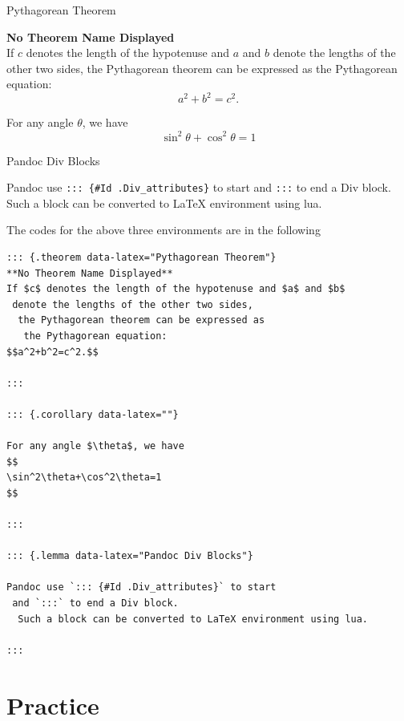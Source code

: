 \documentclass[en,11pt]{elegantbook}
\begin{document}
\begin{theorem}{Pythagorean Theorem}{}

\textbf{No Theorem Name Displayed}\\
If \(c\) denotes the length of the hypotenuse and \(a\)
and \(b\) denote the lengths of the other two sides,
the Pythagorean theorem can be expressed as the Pythagorean equation:
\[a^2+b^2=c^2.\]

\end{theorem}

\begin{corollary}{}{}

For any angle \(\theta\), we have
\[
\sin^2\theta+\cos^2\theta=1
\]

\end{corollary}

\begin{lemma}{Pandoc Div Blocks}{}

Pandoc use \texttt{:::\ \{\#Id\ .Div\_attributes\}} to start and \texttt{:::}
to end a Div block. Such a block can be converted
to LaTeX environment using lua.

\end{lemma}

The codes for the above three environments are in the following

\begin{verbatim}
::: {.theorem data-latex="Pythagorean Theorem"}
**No Theorem Name Displayed**  
If $c$ denotes the length of the hypotenuse and $a$ and $b$
 denote the lengths of the other two sides,
  the Pythagorean theorem can be expressed as
   the Pythagorean equation:
$$a^2+b^2=c^2.$$

:::

::: {.corollary data-latex=""}

For any angle $\theta$, we have
$$
\sin^2\theta+\cos^2\theta=1
$$

:::

::: {.lemma data-latex="Pandoc Div Blocks"}

Pandoc use `::: {#Id .Div_attributes}` to start
 and `:::` to end a Div block.
  Such a block can be converted to LaTeX environment using lua.

:::

\end{verbatim}

\newpage

\hypertarget{practice}{%
\section{Practice}\label{practice}}
\end{document}
